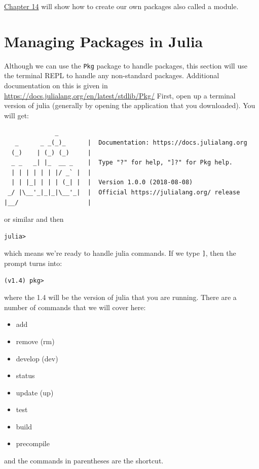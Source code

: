 \href{ch14.html}{Chapter 14} will show how to create our own packages
also called a module.

\hypertarget{managing-packages-in-julia}{%
\section{Managing Packages in
Julia}\label{managing-packages-in-julia}}

Although we can use the \texttt{Pkg} package to handle packages, this
section will use the terminal REPL to handle any non-standard packages.
Additional documentation on this is given in
\href{Julia's\%20package\%20manager\%20help\%20pages}{https://docs.julialang.org/en/latest/stdlib/Pkg/}
First, open up a terminal version of julia (generally by opening the
application that you downloaded). You will get:

\begin{verbatim}
              _
   _      _ _(_)_      |  Documentation: https://docs.julialang.org
  (_)    | (_) (_)     |
  _ _   _| |_  __ _    |  Type "?" for help, "]?" for Pkg help.
  | | | | | | |/ _` |  |
  | | |_| | | | (_| |  |  Version 1.0.0 (2018-08-08)
 _/ |\__'_|_|_|\__'_|  |  Official https://julialang.org/ release
|__/                   |
\end{verbatim}

or similar and then

\begin{verbatim}
julia>
\end{verbatim}

which means we're ready to handle julia commands. If we type
\texttt{{]}}, then the prompt turns into:

\begin{verbatim}
(v1.4) pkg>
\end{verbatim}
% 
where the 1.4 will be the version of julia that you are running. There are a number of commands that we will cover here:

\begin{itemize}
\item  add
\item  remove (rm)
\item  develop (dev)
\item  status
\item  update (up)
\item  test
\item  build
\item  precompile
\end{itemize}
and the commands in parentheses are the shortcut. 

